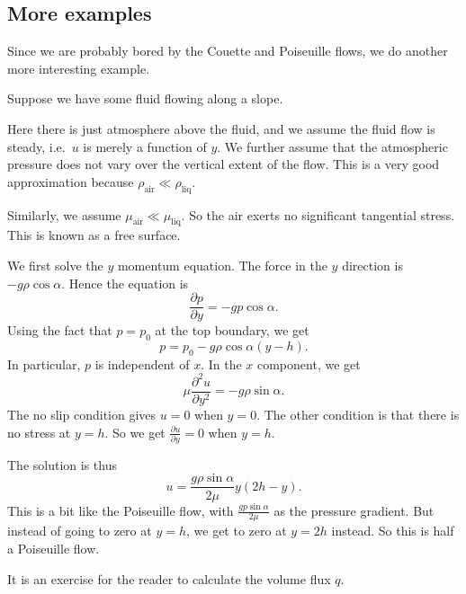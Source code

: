 \documentclass[a4paper]{article}
\begin{document}
\subsection{More examples}
Since we are probably bored by the Couette and Poiseuille flows, we do another more interesting example.
\begin{eg}
  Suppose we have some fluid flowing along a slope.
  \begin{center}
  \end{center}
  Here there is just atmosphere above the fluid, and we assume the fluid flow is steady, i.e.\ $u$ is merely a function of $y$. We further assume that the atmospheric pressure does not vary over the vertical extent of the flow. This is a very good approximation because $\rho_{\mathrm{air}} \ll \rho_{\mathrm{liq}}$.

  Similarly, we assume $\mu_{\mathrm{air}} \ll \mu_{\mathrm{liq}}$. So the air exerts no significant tangential stress. This is known as a free surface.

  We first solve the $y$ momentum equation. The force in the $y$ direction is $-g \rho \cos \alpha$. Hence the equation is
  \[
    \frac{\partial p}{\partial y} = - gp \cos \alpha.
  \]
  Using the fact that $p = p_0$ at the top boundary, we get
  \[
    p = p_0 - g\rho \cos \alpha (y - h).
  \]
  In particular, $p$ is independent of $x$. In the $x$ component, we get
  \[
    \mu \frac{\partial^2 u}{\partial y^2} = - g\rho \sin \alpha.
  \]
  The no slip condition gives $u = 0$ when $y = 0$. The other condition is that there is no stress at $y = h$. So we get $\frac{\partial u}{\partial y} = 0$ when $y = h$.

  The solution is thus
  \[
    u = \frac{g\rho\sin \alpha}{2 \mu} y(2h - y).
  \]
  This is a bit like the Poiseuille flow, with $\frac{gp \sin \alpha}{2\mu}$ as the pressure gradient. But instead of going to zero at $y = h$, we get to zero at $y = 2h$ instead. So this is half a Poiseuille flow. %

  It is an exercise for the reader to calculate the volume flux $q$.
\end{eg}
\end{document}
